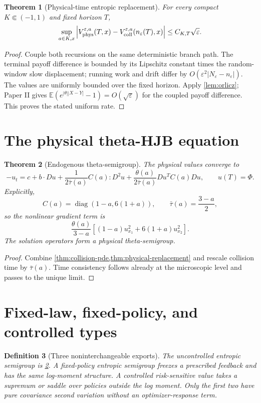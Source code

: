 \documentclass[11pt,reqno]{amsart}
\newtheorem{theorem}{Theorem}[section]
\newtheorem{definition}[theorem]{Definition}
\theoremstyle{remark}
\newcommand{\E}{\mathbb E}
\newcommand{\abs}[1]{\left\lvert #1\right\rvert}
\begin{document}
\begin{theorem}[Physical-time entropic replacement]\label{thm:physical-replacement}
For every compact $K\Subset(-1,1)$ and fixed horizon $T$,
\[
 \sup_{a\in K,x}
 \abs{V_{\rm phys}^{\varepsilon,a}(T,x)
 -V_{\rm coll}^{\varepsilon,a}
 (n_\varepsilon(T),x)}
 \le C_{K,T}\sqrt\varepsilon.
\]
\end{theorem}
\begin{proof}
Couple both recursions on the same deterministic branch path.  The terminal
payoff difference is bounded by its Lipschitz constant times the random-window
slow displacement; running work and drift differ by
$O(\varepsilon^2\abs{N_\varepsilon-n_\varepsilon})$.  The values are uniformly bounded over the fixed horizon.  Apply
\cref{lem:orlicz}; Paper II gives
$\E(e^{\abs\theta\abs{X-Y}}-1)=O(\sqrt\varepsilon)$ for the coupled payoff
difference.  This proves the stated uniform rate.
\end{proof}

\section{The physical theta-HJB equation}
\begin{theorem}[Endogenous theta-semigroup]\label{thm:theta-hjb}
The physical values converge to
\[
 -u_t=c+b\cdot Du+\frac1{2\bar\tau(a)}C(a):D^2u
 +\frac{\theta(a)}{2\bar\tau(a)}Du^TC(a)Du,
 \qquad u(T)=\Phi.
\]
Explicitly,
\[
 C(a)=\operatorname{diag}(1-a,6(1+a)),
 \qquad \bar\tau(a)=\frac{3-a}{2},
\]
so the nonlinear gradient term is
\[
 \frac{\theta(a)}{3-a}
 \left[(1-a)u_{x_1}^2+6(1+a)u_{x_2}^2\right].
\]
The solution operators form a physical theta-semigroup.
\end{theorem}
\begin{proof}
Combine \cref{thm:collision-pde,thm:physical-replacement} and rescale collision
time by $\bar\tau(a)$.  Time consistency follows already at the microscopic
level and passes to the unique limit.
\end{proof}

\section{Fixed-law, fixed-policy, and controlled types}
\begin{definition}[Three noninterchangeable exports]
The \emph{uncontrolled entropic semigroup} is \cref{thm:theta-hjb}.  A
\emph{fixed-policy entropic semigroup} freezes a prescribed feedback and has
the same log-moment structure.  A \emph{controlled risk-sensitive value}
takes a supremum or saddle over policies outside the log moment.  Only the
first two have pure covariance second variation without an optimizer-response
term.
\end{definition}
\end{document}
